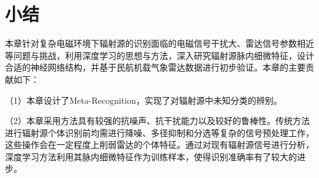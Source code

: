 \section{小结}
\label{sec:sei_summary}
本章针对复杂电磁环境下辐射源的识别面临的电磁信号干扰大、雷达信号参数相近等问题与挑战，利用深度学习的思想与方法，深入研究辐射源脉内细微特征，设计合适的神经网络结构，并基于民航机载气象雷达数据进行初步验证。本章的主要贡献如下：

（1）本章设计了Meta-Recognition，实现了对辐射源中未知分类的辨别。


（2）本章采用方法具有较强的抗噪声、抗干扰能力以及较好的鲁棒性。传统方法进行辐射源个体识别前均需进行降噪、多径抑制和分选等复杂的信号预处理工作，这些操作会在一定程度上削弱雷达的个体特征。通过对现有辐射源信号进行分析，深度学习方法利用其脉内细微特征作为训练样本，使得识别准确率有了较大的进步。
